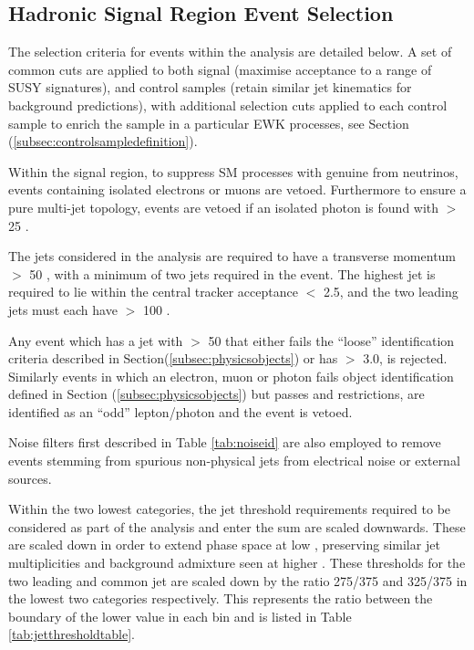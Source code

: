 \subsection{Hadronic Signal Region Event Selection}
\label{subsec:eventselection}

The selection criteria for events within the analysis are detailed below. A set of common cuts are applied to both signal  (maximise acceptance to a range of \ac{SUSY} signatures),  and control samples (retain similar jet kinematics for background predictions), with additional selection cuts applied to each control sample to enrich the sample in a particular \ac{EWK} processes, see Section (\ref{subsec:controlsampledefinition}).


Within the signal region, to suppress \ac{SM} processes with genuine \met from neutrinos, events containing isolated electrons or muons are vetoed. Furthermore to ensure a pure multi-jet topology, events are vetoed if an isolated photon is found with \pt $>$ 25 \GeV. 

The jets considered in the analysis are required to have a transverse momentum \pt $>$ 50 \GeV, with a minimum of two jets required in the event. The highest \et jet is required to lie within the central tracker acceptance \abeta $<$ 2.5, and the two leading \pt jets must each have \pt $>$ 100 \GeV.  

Any event which has a jet with \pt $>$ 50 \GeV that either fails the ``loose'' identification criteria described in Section(\ref{subsec:physicsobjects}) or has \abeta $>$ 3.0, is rejected. Similarly events in which an electron, muon or photon fails object identification defined in Section (\ref{subsec:physicsobjects}) but passes \eta and \pt restrictions, are identified as an ``odd'' lepton/photon and the event is vetoed.

Noise filters first described in Table \ref{tab:noiseid} are also employed to remove events stemming from spurious non-physical jets from electrical noise or external sources.

Within the two lowest \theht categories, the jet \pt threshold requirements required to be considered as part of the analysis and enter the \theht sum are scaled downwards. These are scaled down in order to extend phase space at low \theht, preserving similar jet multiplicities and background admixture seen at higher \theht. These thresholds for the two leading and common jet are scaled down by the ratio 275/375 and 325/375 in the lowest two \theht categories respectively. This represents the ratio between the boundary of the lower \theht value in each bin and is listed in Table \ref{tab:jetthresholdtable}.

